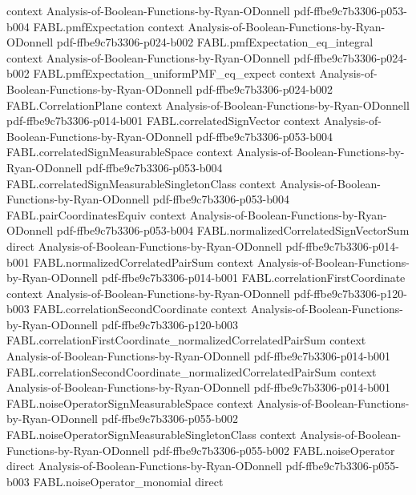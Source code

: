 \begin{theorem}
  {context}
  {Analysis-of-Boolean-Functions-by-Ryan-ODonnell}
  {pdf-ffbe9c7b3306-p053-b004}
\proofstep
  {FABL.pmfExpectation}
  {context}
  {Analysis-of-Boolean-Functions-by-Ryan-ODonnell}
  {pdf-ffbe9c7b3306-p024-b002}
\proofstep
  {FABL.pmfExpectation_eq_integral}
  {context}
  {Analysis-of-Boolean-Functions-by-Ryan-ODonnell}
  {pdf-ffbe9c7b3306-p024-b002}
\proofstep
  {FABL.pmfExpectation_uniformPMF_eq_expect}
  {context}
  {Analysis-of-Boolean-Functions-by-Ryan-ODonnell}
  {pdf-ffbe9c7b3306-p024-b002}
\proofstep
  {FABL.CorrelationPlane}
  {context}
  {Analysis-of-Boolean-Functions-by-Ryan-ODonnell}
  {pdf-ffbe9c7b3306-p014-b001}
\proofstep
  {FABL.correlatedSignVector}
  {context}
  {Analysis-of-Boolean-Functions-by-Ryan-ODonnell}
  {pdf-ffbe9c7b3306-p053-b004}
\proofstep
  {FABL.correlatedSignMeasurableSpace}
  {context}
  {Analysis-of-Boolean-Functions-by-Ryan-ODonnell}
  {pdf-ffbe9c7b3306-p053-b004}
\proofstep
  {FABL.correlatedSignMeasurableSingletonClass}
  {context}
  {Analysis-of-Boolean-Functions-by-Ryan-ODonnell}
  {pdf-ffbe9c7b3306-p053-b004}
\proofstep
  {FABL.pairCoordinatesEquiv}
  {context}
  {Analysis-of-Boolean-Functions-by-Ryan-ODonnell}
  {pdf-ffbe9c7b3306-p053-b004}
\proofstep
  {FABL.normalizedCorrelatedSignVectorSum}
  {direct}
  {Analysis-of-Boolean-Functions-by-Ryan-ODonnell}
  {pdf-ffbe9c7b3306-p014-b001}
\proofstep
  {FABL.normalizedCorrelatedPairSum}
  {context}
  {Analysis-of-Boolean-Functions-by-Ryan-ODonnell}
  {pdf-ffbe9c7b3306-p014-b001}
\proofstep
  {FABL.correlationFirstCoordinate}
  {context}
  {Analysis-of-Boolean-Functions-by-Ryan-ODonnell}
  {pdf-ffbe9c7b3306-p120-b003}
\proofstep
  {FABL.correlationSecondCoordinate}
  {context}
  {Analysis-of-Boolean-Functions-by-Ryan-ODonnell}
  {pdf-ffbe9c7b3306-p120-b003}
\proofstep
  {FABL.correlationFirstCoordinate_normalizedCorrelatedPairSum}
  {context}
  {Analysis-of-Boolean-Functions-by-Ryan-ODonnell}
  {pdf-ffbe9c7b3306-p014-b001}
\proofstep
  {FABL.correlationSecondCoordinate_normalizedCorrelatedPairSum}
  {context}
  {Analysis-of-Boolean-Functions-by-Ryan-ODonnell}
  {pdf-ffbe9c7b3306-p014-b001}
\proofstep
  {FABL.noiseOperatorSignMeasurableSpace}
  {context}
  {Analysis-of-Boolean-Functions-by-Ryan-ODonnell}
  {pdf-ffbe9c7b3306-p055-b002}
\proofstep
  {FABL.noiseOperatorSignMeasurableSingletonClass}
  {context}
  {Analysis-of-Boolean-Functions-by-Ryan-ODonnell}
  {pdf-ffbe9c7b3306-p055-b002}
\proofstep
  {FABL.noiseOperator}
  {direct}
  {Analysis-of-Boolean-Functions-by-Ryan-ODonnell}
  {pdf-ffbe9c7b3306-p055-b003}
\proofstep
  {FABL.noiseOperator_monomial}
  {direct}

\end{theorem}
